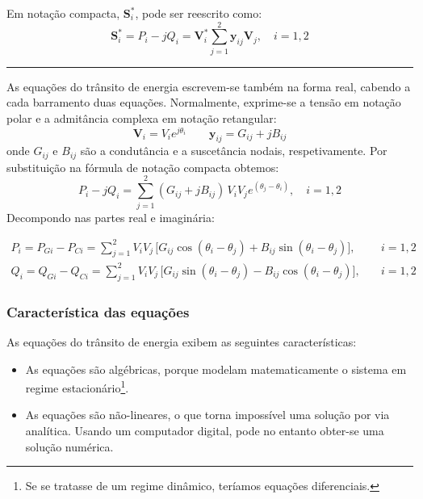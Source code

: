 \noindent Em notação compacta, $\mathbf{S}_i^*$, pode ser reescrito como:
$$
    \mathbf{S}_i^* = P_i - jQ_i = \mathbf{V}_i^*\sum_{j = 1}^2 \mathbf{y}_{ij} \mathbf{V}_j,\quad i = 1,2
$$
\vspace{0.5em}\hrule\vspace{0.5em}
\noindent As equações do trânsito de energia escrevem-se também na forma real, cabendo a cada barramento duas equações. Normalmente, exprime-se a tensão em notação polar e a admitância complexa em notação retangular:
$$
    \mathbf{V}_i = V_i e^{j\theta_i}\qquad
    \mathbf{y}_{ij} = G_{ij} + j B_{ij}
$$
onde $G_{ij}$ e $B_{ij}$ são a condutância e a suscetância nodais, respetivamente. Por substituição na fórmula de notação compacta obtemos:
$$
    P_i - jQ_i = \sum_{j = 1}^2 \left(G_{ij} + j B_{ij}\right)\, V_iV_je^{(\theta_j - \theta_i)},\quad i = 1,2
$$
Decompondo nas partes real e imaginária:
\begin{mdframed}
    $$
        \begin{aligned}
            P_i = P_{Gi} - P_{Ci} = \sum_{j=1}^{2} V_i V_j\, \Big[G_{ij} \cos(\theta_i - \theta_j) + B_{ij} \sin(\theta_i - \theta_j)\Big], \quad &i = 1,2\\
            Q_i = Q_{Gi} - Q_{Ci} = \sum_{j=1}^{2} V_i V_j\, \Big[G_{ij} \sin(\theta_i - \theta_j) - B_{ij} \cos(\theta_i - \theta_j)\Big], \quad &i = 1,2
        \end{aligned}
    $$
\end{mdframed}
\subsubsection{Característica das equações}
As equações do trânsito de energia exibem as seguintes características:

\begin{itemize}
    \item As equações são algébricas, porque modelam matematicamente o sistema em regime estacionário\footnote{Se se tratasse de um regime dinâmico, teríamos equações diferenciais.}.
    
    \item As equações são não-lineares, o que torna impossível uma solução por via analítica. Usando um computador digital, pode no entanto obter-se uma solução numérica.
\end{itemize}

